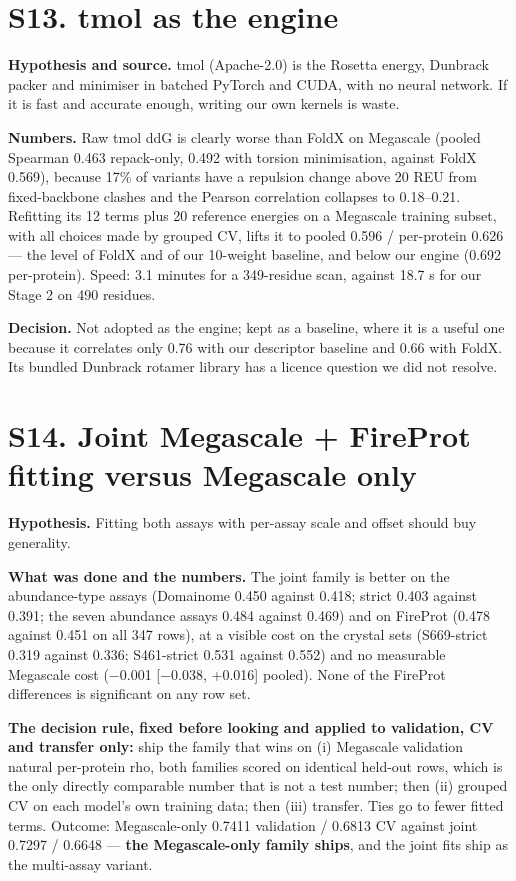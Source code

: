 \documentclass[11pt,a4paper]{article}
\begin{document}
\section{S13. tmol as the engine}

\textbf{Hypothesis and source.} tmol (Apache-2.0) is the Rosetta energy, Dunbrack packer and minimiser in batched
PyTorch and CUDA, with no neural network. If it is fast and accurate enough, writing our own kernels is waste.

\textbf{Numbers.} Raw tmol ddG is clearly worse than FoldX on Megascale (pooled Spearman 0.463 repack-only, 0.492
with torsion minimisation, against FoldX 0.569), because 17\% of variants have a repulsion change above 20 REU
from fixed-backbone clashes and the Pearson correlation collapses to 0.18--0.21. Refitting its 12 terms plus 20
reference energies on a Megascale training subset, with all choices made by grouped CV, lifts it to pooled
0.596 / per-protein 0.626 --- the level of FoldX and of our 10-weight baseline, and below our engine (0.692
per-protein). Speed: 3.1 minutes for a 349-residue scan, against 18.7 s for our Stage 2 on 490 residues.

\textbf{Decision.} Not adopted as the engine; kept as a baseline, where it is a useful one because it correlates only
0.76 with our descriptor baseline and 0.66 with FoldX. Its bundled Dunbrack rotamer library has a licence
question we did not resolve.



\section{S14. Joint Megascale + FireProt fitting versus Megascale only}

\textbf{Hypothesis.} Fitting both assays with per-assay scale and offset should buy generality.

\textbf{What was done and the numbers.} The joint family is better on the abundance-type assays (Domainome 0.450
against 0.418; strict 0.403 against 0.391; the seven abundance assays 0.484 against 0.469) and on FireProt
(0.478 against 0.451 on all 347 rows), at a visible cost on the crystal sets (S669-strict 0.319 against 0.336;
S461-strict 0.531 against 0.552) and no measurable Megascale cost ($-$0.001 [$-$0.038, +0.016] pooled). None of
the FireProt differences is significant on any row set.

\textbf{The decision rule, fixed before looking and applied to validation, CV and transfer only:} ship the family
that wins on (i) Megascale validation natural per-protein rho, both families scored on identical held-out rows,
which is the only directly comparable number that is not a test number; then (ii) grouped CV on each model's
own training data; then (iii) transfer. Ties go to fewer fitted terms. Outcome: Megascale-only 0.7411
validation / 0.6813 CV against joint 0.7297 / 0.6648 --- \textbf{the Megascale-only family ships}, and the joint fits
ship as the multi-assay variant.
\end{document}
